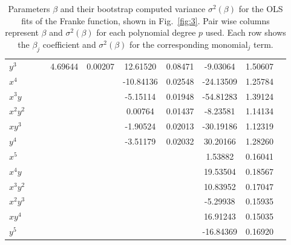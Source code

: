\documentclass[a4paper, twocolumn]{article}
\newcommand{\fig}[1]{Fig.\ \ref{fig:#1}}
\begin{document}
\begin{table}
\begin{tabularx}{\textwidth}{X*{9}{S[table-format=4.3]}}
$y^3$     &          &         &  4.69644 & 0.00207 &  12.61520 & 0.08471 &  -9.03064 & 1.50607 \\[\myrowskip]
$x^4$     &          &         &          &         & -10.84136 & 0.02548 & -24.13509 & 1.25784 \\
$x^3y$    &          &         &          &         &  -5.15114 & 0.01948 & -54.81283 & 1.39124 \\
$x^2y^2$  &          &         &          &         &   0.00764 & 0.01437 &  -8.23581 & 1.14134 \\
$xy^3$    &          &         &          &         &  -1.90524 & 0.02013 & -30.19186 & 1.12319 \\
$y^4$     &          &         &          &         &  -3.51179 & 0.02032 &  30.20166 & 1.28260 \\[\myrowskip]
$x^5$     &          &         &          &         &           &         &   1.53882 & 0.16041 \\
$x^4y$    &          &         &          &         &           &         &  19.53504 & 0.18567 \\
$x^3y^2$  &          &         &          &         &           &         &  10.83952 & 0.17047 \\
$x^2y^3$  &          &         &          &         &           &         &  -5.29938 & 0.15935 \\
$xy^4$    &          &         &          &         &           &         &  16.91243 & 0.15035 \\
$y^5$     &          &         &          &         &           &         & -16.84369 & 0.16920 \\
\bottomrule 
\end{tabularx}
\caption{Parameters $\beta$ and their bootstrap computed variance $\sigma^2(\beta)$ for the OLS fits of the Franke function, shown in \fig{3}. Pair wise columns represent $\beta$ and $\sigma^2(\beta)$ for each polynomial degree $p$ used. Each row shows the $\beta_j$ coefficient and $\sigma^2(\beta)$ for the corresponding monomial${}_j$ term. \label{tab:1}}
\end{table}
\end{document}
